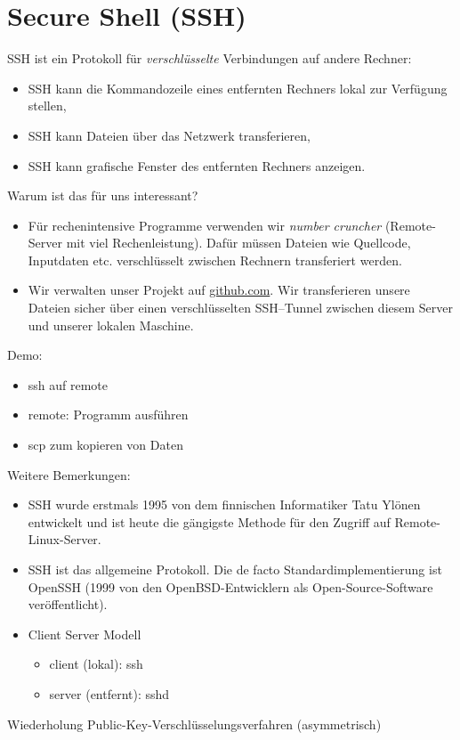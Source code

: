 \section{Secure Shell (SSH)}
SSH ist ein Protokoll für \textit{verschlüsselte} Verbindungen auf andere Rechner:
\begin{itemize}
	\item SSH kann die Kommandozeile eines entfernten Rechners lokal zur Verfügung stellen,
	\item SSH kann Dateien über das Netzwerk transferieren,
	\item SSH kann grafische Fenster des entfernten Rechners anzeigen.
\end{itemize}
Warum ist das für uns interessant?
\begin{itemize}
	\item Für rechenintensive Programme verwenden wir \textit{number cruncher} (Remote-Server mit viel Rechenleistung). Dafür müssen Dateien wie Quellcode, Inputdaten etc. verschlüsselt zwischen Rechnern transferiert werden.
	\item Wir verwalten unser Projekt auf \url{github.com}. Wir transferieren unsere Dateien sicher über einen verschlüsselten SSH--Tunnel zwischen diesem Server und unserer lokalen Maschine. 
\end{itemize}
Demo:
\begin{itemize}
	\item  ssh auf remote
\item remote: Programm ausführen
 \item scp zum kopieren von Daten
\end{itemize}
Weitere Bemerkungen:
\begin{itemize}
	\item SSH wurde erstmals 1995 von dem finnischen Informatiker Tatu Ylönen entwickelt und ist heute die gängigste Methode für den Zugriff auf Remote-Linux-Server.
	\item SSH ist das allgemeine Protokoll. Die de facto Standardimplementierung ist OpenSSH (1999 von den OpenBSD-Entwicklern als Open-Source-Software veröffentlicht).
	\item Client Server Modell
	\begin{itemize}
		\item client (lokal): ssh
		\item server (entfernt): sshd
	\end{itemize}
\end{itemize}
Wiederholung Public-Key-Verschlüsselungsverfahren (asymmetrisch)
